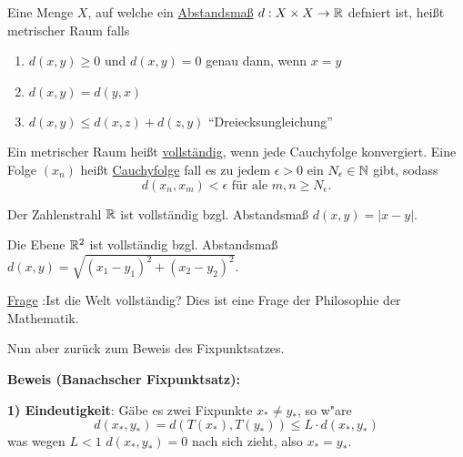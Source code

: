 \documentclass[a4paper,10pt]{article}
\begin{document}
\begin{defi}
 Eine Menge $X$, auf welche ein \underline{Abstandsmaß} $d: X \times X \to \mathbb{R}$ defniert ist,
 heißt metrischer Raum falls
 \begin{enumerate}
  \item $d(x, y) \geq 0 $ und $d(x,y) =0$ genau dann, wenn $x=y$
  \item $d(x,y) = d(y,x)$
  \item $d(x,y) \leq d(x,z) + d(z,y)$ ``Dreiecksungleichung''
 \end{enumerate}

\end{defi}

\begin{defi}
 Ein metrischer Raum heißt \underline{vollständig}, wenn jede Cauchyfolge konvergiert.
 Eine Folge $(x_n)$ heißt \underline{Cauchyfolge} fall es zu jedem $\epsilon > 0$ ein 
 $N_\epsilon \in \mathbb{N}$ gibt, sodass
 \[
  d(x_n, x_m) < \epsilon \text{ für ale } m,n \geq N_\epsilon.
 \]

\end{defi}


\begin{center}
 
\end{center}
 



\begin{expl*}
 Der Zahlenstrahl $\mathbb{R}$ ist vollständig bzgl. Abstandsmaß $d(x,y)= |x - y|$.
 
 \noindent
 Die Ebene $\mathbb{R}^2$ ist vollständig bzgl. Abstandsmaß $d(x,y) = \sqrt{(x_1 - y_1)^2 + (x_2 - y_2)^2}$.
\end{expl*}

\underline{Frage} :Ist die Welt vollständig? Dies ist eine Frage der Philosophie der Mathematik.

Nun aber zurück zum Beweis des Fixpunktsatzes.

\vspace{0.5cm}
\noindent
\textbf{Beweis (Banachscher Fixpunktsatz):}

 \vspace{.2cm}
 \noindent
 \textbf{1) Eindeutigkeit}:
 Gäbe es zwei Fixpunkte $x_* \neq y_*$, so w"are \newline
 \[d(x_*, y_*) = d(T(x_*), T(y_*)) \leq L \cdot d(x_*, y_*)\]
 was wegen $L< 1$ $d(x_*,y_*) =0$ nach sich zieht, also $x_*= y_*$.
\end{document}
